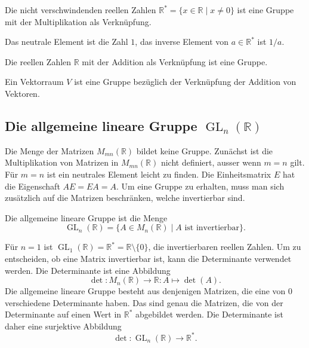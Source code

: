 \begin{beispiel}
Die nicht verschwindenden reellen Zahlen
$\mathbb R^*=\{x\in\mathbb R\;|\; x\ne 0\}$
ist eine Gruppe mit der Multiplikation als Verknüpfung.

\smallskip

{\parindent0pt Das neutrale} Element ist die Zahl $1$, das inverse Element
von $a\in\mathbb R^*$ ist $1/a$.
\end{beispiel}

\begin{beispiel}
Die reellen Zahlen $\mathbb R$ mit der Addition als Verknüpfung ist eine
Gruppe.
\end{beispiel}

\begin{beispiel}
Ein Vektorraum $V$ ist eine Gruppe bezüglich der Verknüpfung der Addition
von Vektoren.
\end{beispiel}

%
%
\subsection{Die allgemeine lineare Gruppe $\operatorname{GL}_n(\mathbb R)$}
Die Menge der Matrizen $M_{mn}(\mathbb R)$ bildet keine Gruppe.
Zunächst ist die Multiplikation von Matrizen in $M_{mn}(\mathbb R)$
nicht definiert, ausser wenn $m=n$ gilt.
Für $m=n$ ist ein neutrales Element leicht zu finden.
Die Einheitsmatrix $E$ hat die Eigenschaft $AE=EA=A$.
Um eine Gruppe zu erhalten, muss man sich zusätzlich auf die 
Matrizen beschränken, welche invertierbar sind.

\begin{definition}
Die allgemeine lineare Gruppe ist die Menge
\[
\operatorname{GL}_n(\mathbb R)
=
\{ A\in M_n(\mathbb R)\;|\; \text{$A$ ist invertierbar}\}.
\]
\end{definition}

Für $n=1$ ist $\operatorname{GL}_1(\mathbb R) = \mathbb R^*
= \mathbb R\setminus \{0\}$, die invertierbaren reellen Zahlen.
Um zu entscheiden, ob eine Matrix invertierbar ist, kann die Determinante
verwendet werden.
Die Determinante ist eine Abbildung
\[
\det
\colon
M_n(\mathbb R) \to \mathbb R
:
A \mapsto \det(A).
\]
Die allgemeine lineare Gruppe besteht aus denjenigen Matrizen,
die eine von $0$ verschiedene Determinante haben.
Das sind genau die Matrizen, die von der Determinante
auf einen Wert in $\mathbb R^*$ abgebildet werden.
Die Determinante ist daher eine surjektive Abbildung
\[
\det
\colon
\operatorname{GL}_n(\mathbb R)
\to
\mathbb R^*.
\]

